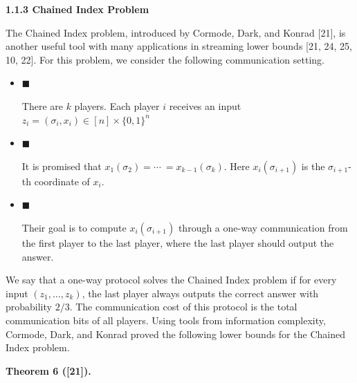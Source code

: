 \documentclass[10pt,a4paper]{article}
\begin{document}
\par\medskip\noindent\textbf{
1.1.3 Chained Index Problem}\par




The Chained Index problem, introduced by Cormode, Dark, and Konrad [21], is another useful tool with many applications in streaming lower bounds [21, 24, 25, 10, 22]. For this problem, we consider the following communication setting.\par


\begin{itemize}


\item[] 
$\blacksquare$ 


There are $k$ players. Each player $i$ receives an input $z_{i}=(\sigma_{i},x_{i})\in[n]\times\{0,1\}^{n}$\par





\item[] 
$\blacksquare$ 


It is promised that $x_{1}(\sigma_{2})=\cdots\ =x_{k-1}(\sigma_{k}).$ Here $x_{i}(\sigma_{i+1})$ is the $\sigma_{i+1}$-th coordinate of $x_{i}$.\par





\item[] 
$\blacksquare$ 


Their goal is to compute $x_{i}(\sigma_{i+1})$ through a one-way communication from the first player to the last player, where the last player should output the answer.\par





\end{itemize}


We say that a one-way protocol solves the Chained Index problem if for every input $(z_{1},\dots,z_{k})$, the last player always outputs the correct answer with probability $2/3$. The communication cost of this protocol is the total communication bits of all players. Using tools from information complexity, Cormode, Dark, and Konrad proved the following lower bounds for the Chained Index problem.\par





\par\medskip\noindent\textbf{
\textbf{Theorem 6}\textbf{ }([21])\textbf{.}
}\par
\end{document}
